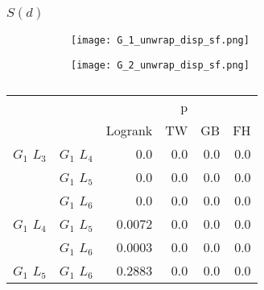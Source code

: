       
      
        

      
      
      



      \subsubsection{$S(d)$}

      \begin{figure}[h!]
        \centering
        
        \begin{subfigure}[b]{0.45\textwidth}
          \texttt{[image: G\_1\_unwrap\_disp\_sf.png]}
          \caption{}
          \label{fig:sf_g1_branch_disp}
        \end{subfigure}
        \hfill
        \begin{subfigure}[b]{0.45\textwidth}
          \texttt{[image: G\_2\_unwrap\_disp\_sf.png]}
          \caption{}
          \label{fig:sf_g2_branch_disp}
        \end{subfigure}

        \caption{}
        \label{fig:sf_branch_disp}

      \end{figure}


      \begin{table}[h!]
        \centering
        \begin{tabular}{llrrrr}
          \toprule
                       &             &         &  p &    &     \\
          \cmidrule{3-6}
                       &             & Logrank & TW & GB & FH  \\
          \midrule
          $G_1$ $L_3$  & $G_1$ $L_4$  &  0.0 &  0.0 &  0.0 &  0.0     \\
                       & $G_1$ $L_5$  & 0.0 & 0.0 & 0.0 & 0.0    \\
                       & $G_1$ $L_6$  & 0.0 & 0.0 & 0.0 & 0.0      \\
          $G_1$ $L_4$  & $G_1$ $L_5$  & 0.0072 & 0.0 & 0.0 & 0.0      \\
                       & $G_1$ $L_6$  & 0.0003 & 0.0 & 0.0 & 0.0       \\
          $G_1$ $L_5$   & $G_1$ $L_6$ & 0.2883 &  0.0 & 0.0 & 0.0      \\
          \bottomrule
        \end{tabular}
        \label{tab:g1_ingroup_tests_disp}
        \caption{}
      \end{table}


